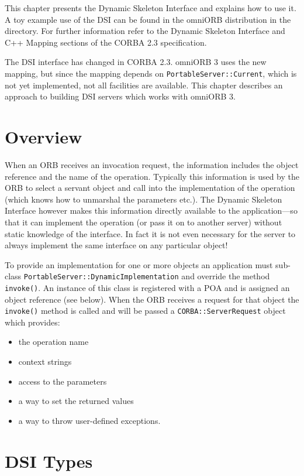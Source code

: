 \documentclass[11pt,twoside,a4paper]{book}
\newcommand{\type}[1]{\texttt{#1}}
\newcommand{\op}[1]{\texttt{#1()}}
\newcommand{\file}{\begingroup \urlstyle{tt}\Url}
\begin{document}
This chapter presents the Dynamic Skeleton Interface and explains how
to use it.  A toy example use of the DSI can be found in the omniORB
distribution in the \file{src/examples/dsi} directory.  For further
information refer to the Dynamic Skeleton Interface and C++ Mapping
sections of the CORBA 2.3 specification.

The DSI interface has changed in CORBA 2.3. omniORB 3 uses the new
mapping, but since the mapping depends on
\type{PortableServer::Current}, which is not yet implemented, not all
facilities are available. This chapter describes an approach to
building DSI servers which works with omniORB 3.

\section{Overview}

When an ORB receives an invocation request, the information includes
the object reference and the name of the operation. Typically this
information is used by the ORB to select a servant object and call
into the implementation of the operation (which knows how to unmarshal
the parameters etc.).  The Dynamic Skeleton Interface however makes
this information directly available to the application---so that it
can implement the operation (or pass it on to another server) without
static knowledge of the interface. In fact it is not even necessary
for the server to always implement the same interface on any
particular object!

To provide an implementation for one or more objects an application
must sub-class \type{PortableServer::DynamicImplementation} and
override the method \op{invoke}.  An instance of this class is
registered with a POA and is assigned an object reference (see below).
When the ORB receives a request for that object the \op{invoke} method
is called and will be passed a \type{CORBA::ServerRequest} object
which provides:

\begin{itemize}
\item the operation name
\item context strings
\item access to the parameters
\item a way to set the returned values
\item a way to throw user-defined exceptions.
\end{itemize}


\section{DSI Types}
\end{document}
